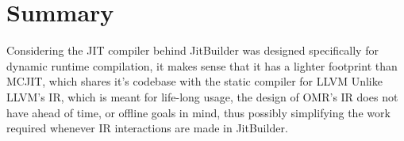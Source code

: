 \section{Summary}
\label{sec:summary}
Considering the JIT compiler behind JitBuilder was designed specifically for dynamic runtime compilation, it makes sense that it has a lighter footprint than MCJIT, which shares it's codebase with the static compiler for LLVM
Unlike LLVM's IR, which is meant for life-long usage, the design of OMR's IR does not have ahead of time, or offline goals in mind, thus
possibly simplifying the work required whenever IR interactions are made in JitBuilder.
